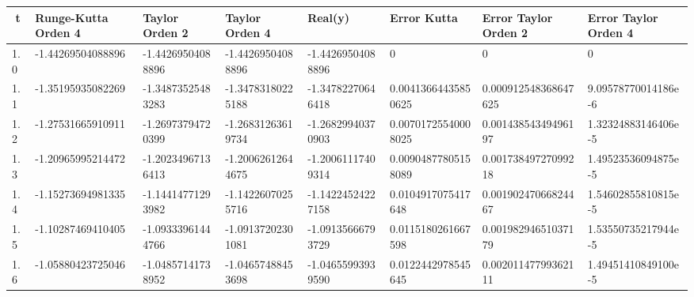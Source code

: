 \documentclass[12pt,b4paper,landscape]{memoir}
\begin{document}
\begin{table}[]

\begin{tabular}{|l|l|l|l|l|l|l|l|}
\hline

\multicolumn{1}{|c|}{\textbf{t}} & \textbf{Runge-Kutta Orden 4} & \textbf{Taylor Orden 2}                 & \textbf{Taylor Orden 4} & \textbf{Real(y)}   & \textbf{Error Kutta} & \textbf{Error Taylor Orden 2} & \textbf{Error Taylor Orden 4} \\ \hline
1.0                                                      & -1.44269504088896            & -1.44269504088896                       & -1.44269504088896       & -1.44269504088896  & 0                    & 0                             & 0                             \\ \hline
1.1                                                      & -1.35195935082269            & -1.34873525483283                       & -1.34783180225188       & -1.34782270646418  & 0.00413664435850625  & 0.000912548368647625          & 9.09578770014186e-6           \\ \hline
1.2                                                      & -1.27531665910911            & -1.26973794720399                       & -1.26831263619734       & -1.26829940370903  & 0.00701725540008025  & 0.00143854349496197           & 1.32324883146406e-5           \\ \hline
1.3                                                      & -1.20965995214472            & -1.20234967136413                       & -1.20062612644675       & -1.20061117409314  & 0.00904877805158089  & 0.00173849727099218           & 1.49523536094875e-5           \\ \hline
1.4                                                      & -1.15273694981335            & -1.14414771293982                       & -1.14226070255716       & -1.14224524227158  & 0.0104917075417648   & 0.00190247066824467           & 1.54602855810815e-5           \\ \hline
1.5                                                      & -1.10287469410405            & -1.09333961444766                       & -1.09137202301081       & -1.09135666793729  & 0.0115180261667598   & 0.00198294651037179           & 1.53550735217944e-5           \\ \hline
1.6                                                      & -1.05880423725046            & \multicolumn{1}{l|}{-1.04857141738952}  & -1.04657488453698       & -1.04655993939590  & 0.0122442978545645   & 0.00201147799362111           & 1.49451410849100e-5           \\ \hline

\end{tabular}
\end{table}
\end{document}
